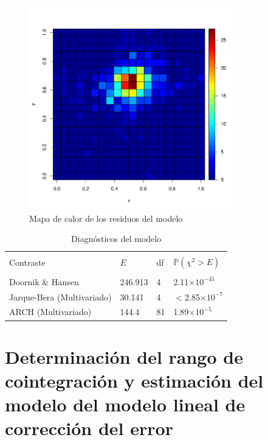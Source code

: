 \documentclass[12pt, twoside]{book}\usepackage[]{graphicx}\usepackage[]{color}
\newenvironment{knitrout}{}{} %
\numberwithin{equation}{section}
\numberwithin{theorem}{section}
\numberwithin{teorema}{section}
\numberwithin{defi}{section}
\numberwithin{prop}{section}
\numberwithin{defi}{section}
\theoremstyle{plain}
\begin{document}
\begin{knitrout}
\color{fgcolor}\begin{figure}[!htpb]

{\centering \includegraphics[width=3.5in,height=3.5in]{figure/fig-5_3_2-1} 

}

\caption[Mapa de calor de los residuos del modelo]{Mapa de calor de los residuos del modelo}\label{fig:fig-5.3.2}
\end{figure}


\end{knitrout}




\begin{table}[!htpb]
\centering
\caption{Diagnósticos del modelo}
\begin{tabular}{@{}llll@{}}
\toprule \\ 
Contraste   & $E$ & df & $\mathbb{P}(\chi^{2}>E)$ \\
\midrule \\ 
Doornik \& Hansen & 246.913 & 4 & 2.11$\times 10^{-45}$ \\
Jarque-Bera (Multivariado) & 30.141 & 4 & $<$2.85$\times 10^{-7}$ \\
ARCH (Multivariado) & 144.4 & 81 & 1.89$\times 10^{-5}$ \\ 
\bottomrule 
\end{tabular}
\end{table}

\section{Determinación del rango de cointegración y estimación del modelo del modelo lineal de corrección del error}
\end{document}
